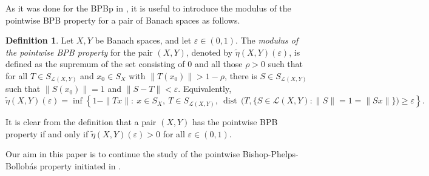 \documentclass[a4paper,10pt]{amsart}
\theoremstyle{plain}
\theoremstyle{definition}
\newtheorem{definition}[theorem]{Definition}
\DeclareMathOperator{\dist}{dist\,}
\newcommand{\eps}{\varepsilon}
\renewcommand{\geq}{\geqslant}
\begin{document}
As it was done for the BPBp in \cite{ACKLM}, it is useful to introduce the modulus of the pointwise BPB property for a pair of Banach spaces as follows.

\begin{definition}
Let $X, Y$ be Banach spaces, and let $\eps \in (0, 1)$. The \emph{modulus of the pointwise BPB property} for the pair $(X, Y)$, denoted by  $\tilde\eta(X, Y)(\eps)$, is defined as the supremum of the set consisting of $0$ and all those $\rho > 0$ such that for all $T \in S_{\mathcal{L}(X, Y)}$ and $x_0 \in S_X$ with $\|T(x_0)\| > 1 - \rho$, there is $S \in S_{\mathcal{L}(X, Y)}$ such that $\|S(x_0)\| = 1$ and $\|S - T\| < \eps$. Equivalently,
\begin{equation*}
\tilde\eta(X, Y)(\eps) = \inf \left\{ 1 - \|Tx\|\colon \ x \in S_X, \ T \in S_{\mathcal{L}(X, Y)},  \ \dist\bigl(T,\{ S\in \mathcal{L}(X, Y)\colon \|S\|=1= \|Sx\|\}\bigr) \geq \eps \right\}.
\end{equation*}
\end{definition}

It is clear from the definition that a pair $(X, Y)$ has the pointwise BPB property if and only if $\tilde\eta(X,Y)(\eps)>0$ for all $\eps \in (0, 1)$.

Our aim in this paper is to continue the study of the pointwise Bishop-Phelps-Bollob\'{a}s property initiated in \cite{DKL}.
\end{document}
